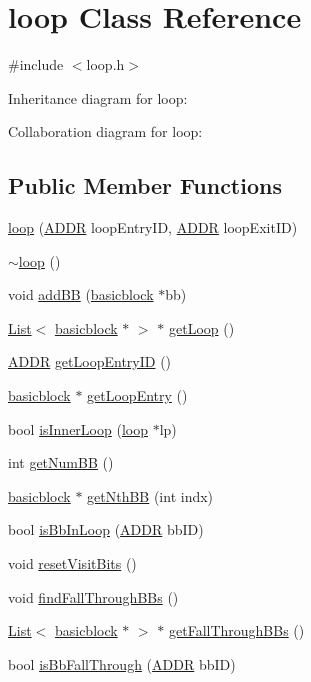 \hypertarget{classloop}{
\section{loop Class Reference}
\label{classloop}
}


{\ttfamily \#include $<$loop.h$>$}



Inheritance diagram for loop:


Collaboration diagram for loop:
\subsection*{Public Member Functions}
\begin{DoxyCompactItemize}
\item 
\hyperlink{classloop_a56aab74b3345d5731cd1243e2a41bc76}{loop} (\hyperlink{binaryTranslator_2global_8h_aa4557b0650cb21e57e3e4623410832c6}{ADDR} loopEntryID, \hyperlink{binaryTranslator_2global_8h_aa4557b0650cb21e57e3e4623410832c6}{ADDR} loopExitID)
\item 
\hyperlink{classloop_aad652628bd3d921231b869db97e528ad}{$\sim$loop} ()
\item 
void \hyperlink{classloop_aa9324a68eb1fc3b86eabff7815132443}{addBB} (\hyperlink{classbasicblock}{basicblock} $\ast$bb)
\item 
\hyperlink{classList}{List}$<$ \hyperlink{classbasicblock}{basicblock} $\ast$ $>$ $\ast$ \hyperlink{classloop_af5ef5dd07e6d5b52f318320cc7d6b037}{getLoop} ()
\item 
\hyperlink{binaryTranslator_2global_8h_aa4557b0650cb21e57e3e4623410832c6}{ADDR} \hyperlink{classloop_a6abf8e7d6763e76673f8287fe15785d4}{getLoopEntryID} ()
\item 
\hyperlink{classbasicblock}{basicblock} $\ast$ \hyperlink{classloop_a30c7019f2202671a81d8a33f9a33593e}{getLoopEntry} ()
\item 
bool \hyperlink{classloop_a6a34ac2a05496bd2192638280e42c316}{isInnerLoop} (\hyperlink{classloop}{loop} $\ast$lp)
\item 
int \hyperlink{classloop_a81113f34513c9e9ae41886ea150cbd3d}{getNumBB} ()
\item 
\hyperlink{classbasicblock}{basicblock} $\ast$ \hyperlink{classloop_a69d626e1bbfa64a45f3ddf805998967a}{getNthBB} (int indx)
\item 
bool \hyperlink{classloop_aff5df3cffef530a6e4f81ecd4deed86e}{isBbInLoop} (\hyperlink{binaryTranslator_2global_8h_aa4557b0650cb21e57e3e4623410832c6}{ADDR} bbID)
\item 
void \hyperlink{classloop_a49a50718778d9b23d51385a93aed10a8}{resetVisitBits} ()
\item 
void \hyperlink{classloop_a20ecb89d8b7cb21867fe53c6ad56f0f4}{findFallThroughBBs} ()
\item 
\hyperlink{classList}{List}$<$ \hyperlink{classbasicblock}{basicblock} $\ast$ $>$ $\ast$ \hyperlink{classloop_a6d90e411616771613671b11dd58d380d}{getFallThroughBBs} ()
\item 
bool \hyperlink{classloop_a550955b42ceff7c89445322abc564e28}{isBbFallThrough} (\hyperlink{binaryTranslator_2global_8h_aa4557b0650cb21e57e3e4623410832c6}{ADDR} bbID)
\end{DoxyCompactItemize}


